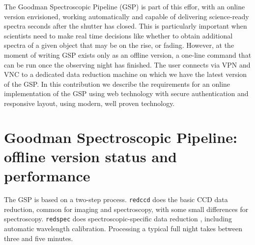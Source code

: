 \documentclass[11pt,twoside]{article}
\begin{document}
The Goodman Spectroscopic Pipeline (GSP) is part of this effor, with an online version envisioned, working automatically and capable of delivering science-ready spectra seconds after the shutter has closed. This is particularly important when scientists need to make real time decisions like whether to obtain additional spectra of a given  object that may be on the rise, or fading. However, at the moment of writing GSP exists only as an offline version, a one-line command that can be run once the observing night has finished. The user connects via VPN and VNC to a dedicated data reduction machine on which we have the latest version of the GSP. 
In this contribution we describe the requirements for an online implementation of the GSP using web technology with secure authentication and responsive layout, using modern, well proven technology.

\section{Goodman Spectroscopic Pipeline: offline version status and performance}

The GSP is based on a two-step process. \verb=redccd= does the basic CCD data reduction, common for imaging and spectroscopy, with some small differences for spectroscopy. \verb=redspec= does spectroscopic-specific data reduction \citet{2013pss2.book...35M}, including automatic wavelength calibration. Processing a typical full night takes between three and five minutes.
\end{document}
